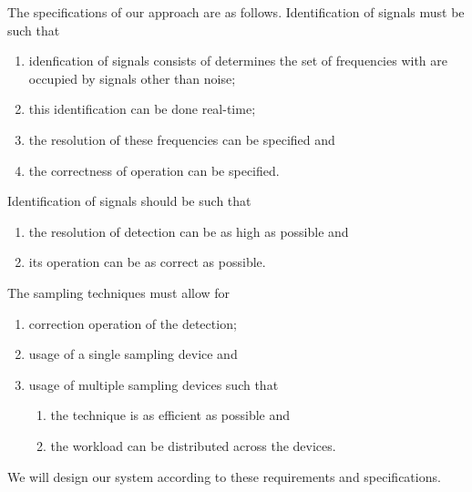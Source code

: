 \documentclass[a4paper, openany, oneside]{memoir}
\begin{document}
The specifications of our approach are as follows. Identification of signals must be such that
\begin{enumerate}
    \item idenfication of signals consists of determines the set of frequencies with are occupied by signals other than noise;
    \item this identification can be done real-time;
    \item the resolution of these frequencies can be specified and
    \item the correctness of operation can be specified.
\end{enumerate}
Identification of signals should be such that
\begin{enumerate}
    \item the resolution of detection can be as high as possible and
    \item its operation can be as correct as possible.
\end{enumerate}

The sampling techniques must allow for
\begin{enumerate}
    \item correction operation of the detection;
    \item usage of a single sampling device and
    \item usage of multiple sampling devices such that
    \begin{enumerate}
        \item the technique is as efficient as possible and
        \item the workload can be distributed across the devices.
    \end{enumerate}
\end{enumerate}

We will design our system according to these requirements and specifications.


\end{document}
